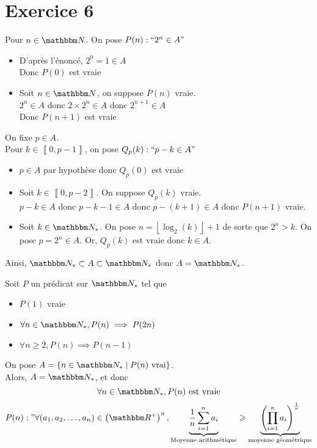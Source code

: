 \part{Exercice 6}

Pour $n \in \N$.
On pose $P(n): ``2^n \in A"$
\begin{itemize}
	\item D'après l'énoncé, $2^0 = 1 \in A$\\
		Donc $P(0)$ est vraie
	\item Soit $n \in \N$, on suppose $P(n)$ vraie.\\
		$2^n \in A$ donc $2 \times 2^n \in A$ donc $2^{n+1} \in A$\\
		Donc $P(n+1)$ est vraie
\end{itemize}

On fixe $p \in A$.\\
Pour $k \in \left\llbracket 0,p - 1 \right\rrbracket$,
on pose $Q_p(k): ``p-k\in A"$

\begin{itemize}
	\item $p \in A$ par hypothèse donc $Q_p(0)$ est vraie
	\item Soit $k \in \left\llbracket 0, p-2 \right\rrbracket$. On suppose $Q_p(k)$ vraie.\\
		$p - k \in A$ donc $p - k - 1 \in A$ donc $p - (k + 1) \in A$ donc $P(n+1)$ vraie.
	\item Soit $k \in \N_*$. On pose $n = \left\lfloor \log_2(k) \right\rfloor +1$ de sorte que $2^n > k$. On pose $p = 2^n \in A$. Or, $Q_p(k)$ est vraie donc $k \in A$.
\end{itemize}

Ainsi, $\N_* \subset  A \subset \N_*$ donc $A = \N_*$.

Soit $P$ un prédicat sur $\N_*$ tel que
\begin{itemize}
	\item $P(1)$ vraie
	\item $\forall n \in \N_*, P(n) \implies P(2n)$
	\item $\forall n \ge 2, P(n) \implies P(n-1)$
\end{itemize}
On pose $A = \{ n \in \N_*  \mid  P(n) \text{ vrai}\}$.\\
Alors, $A = \N_*$, et donc \[
	\forall n \in \N_*, P(n) \text{ est vraie}
\] 
\[
	P(n): "\forall (a_1,a_2, \ldots, a_n) \in \left( \R^+ \right) ^n,
	\underbrace{\frac{1}{n}\sum_{i=1}^{n} a_i}_\text{Moyenne arithmétique} \ge \underbrace{\left( \prod_{i=1}^{n} a_i \right) ^{\frac{1}{n}}}_\text{moyenne géométrique} 
\] 

